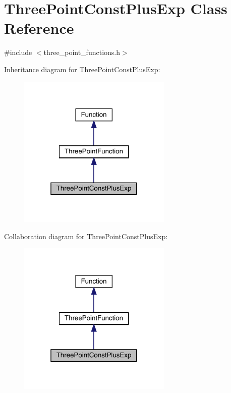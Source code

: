 \hypertarget{classThreePointConstPlusExp}{}\section{Three\+Point\+Const\+Plus\+Exp Class Reference}
\label{classThreePointConstPlusExp}


{\ttfamily \#include $<$three\+\_\+point\+\_\+functions.\+h$>$}



Inheritance diagram for Three\+Point\+Const\+Plus\+Exp\+:
\nopagebreak
\begin{figure}[H]
\begin{center}
\leavevmode
\includegraphics[width=208pt]{d0/d4b/classThreePointConstPlusExp__inherit__graph}
\end{center}
\end{figure}


Collaboration diagram for Three\+Point\+Const\+Plus\+Exp\+:
\nopagebreak
\begin{figure}[H]
\begin{center}
\leavevmode
\includegraphics[width=208pt]{d0/d4e/classThreePointConstPlusExp__coll__graph}
\end{center}
\end{figure}
